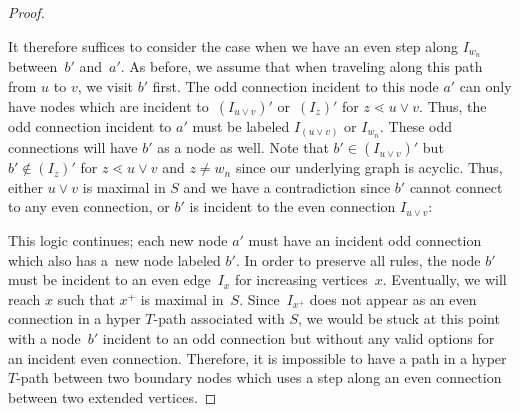 \documentclass[pdftex]{sigma}
\numberwithin{equation}{section}
\begin{document}
\begin{proof}
\begin{center}
\end{center}
It therefore suffices to consider the case when we have an even step along $I_{w_n}$ between~$b'$ and~$a'$. As before, we assume that when traveling along this path from $u$ to $v$, we visit $b'$ first. The odd connection incident to this node $a'$ can only have nodes which are incident to~$(I_{u \vee v})'$ or~$(I_z)'$ for $z \lessdot u \vee v$. Thus, the odd connection incident to $a'$ must be labeled $I_{(u \vee v)}$ or $I_{w_n}$. These odd connections will have $b'$ as a node as well. Note that $b' \in (I_{u \vee v})'$ but $b' \notin (I_z)'$ for $z \lessdot u \vee v$ and $z \neq w_n$ since our underlying graph is acyclic. Thus, either $u\vee v$ is maximal in $S$ and we have a contradiction since $b'$ cannot connect to any even connection, or $b'$ is incident to the even connection $I_{u \vee v}$:
\begin{center}
\end{center}
This logic continues; each new node $a'$ must have an incident odd connection which also has a~new node labeled $b'$. In order to preserve all rules, the node $b'$ must be incident to an even edge~$I_x$ for increasing vertices~$x$. Eventually, we will reach $x$ such that $x^+$ is maximal in~$S$. Since~$I_{x^+}$ does not appear as an even connection in a hyper $T$-path associated with $S$, we would be stuck at this point with a node~$b'$ incident to an odd connection but without any valid options for an incident even connection. Therefore, it is impossible to have a path in a hyper $T$-path between two boundary nodes which uses a step along an even connection between two extended vertices.

\end{proof}
\end{document}

